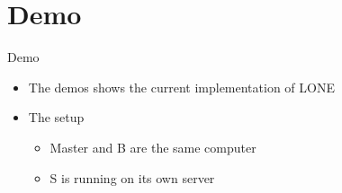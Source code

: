 \author{Rasmus Steiniche}
\section{Demo}
\begin{frame}{Demo}
\begin{itemize}
	\item The demos shows the current implementation of LONE
	\item The setup
	\begin{itemize}
		\item Master and B are the same computer
		\item S is running on its own server
	\end{itemize}
\end{itemize}
\end{frame}